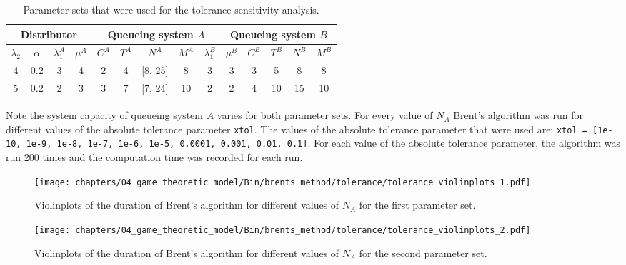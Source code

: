 \begin{table}[H]
    \caption{Parameter sets that were used for the tolerance
    sensitivity analysis.}
    \begin{center}
        \small
        \begin{tabular}{||c|c|c|c||c|c|c|c|c||c|c|c|c|c||}
            \hline
            \multicolumn{4}{||c||}{\textbf{Distributor}} &
            \multicolumn{5}{c||}{\textbf{Queueing system \(A\)}} &
            \multicolumn{5}{c||}{\textbf{Queueing system \(B\)}} \\
            \hline
            \(\lambda_2\) & \(\alpha\) &
            \(\lambda_1^A\) & \(\mu^A\) & \(C^A\) & \(T^A\) & \(N^A\) & \(M^A\) &
            \(\lambda_1^B\) & \(\mu^B\) & \(C^B\) & \(T^B\) & \(N^B\) & \(M^B\) \\
            \hline
            4 & 0.2 & 3 & 4 & 2 & 4 & [8, 25] & 8 & 3 & 3 & 3 & 5 & 8 & 8 \\
            \hline
            5 & 0.2 & 2 & 3 & 3 & 7 & [7, 24] & 10 & 2 & 2 & 4 & 10 & 15 & 10 \\
            \hline
        \end{tabular}
    \end{center}
    \label{tab:tolerance_sensitivity_parameters}
\end{table}

Note the system capacity of queueing system \(A\) varies for both parameter sets.
For every value of \(N_A\) Brent's algorithm was run for different values of
the absolute tolerance parameter \texttt{xtol}.
The values of the absolute tolerance parameter that were used are:
\texttt{xtol = [1e-10, 1e-9, 1e-8, 1e-7, 1e-6, 1e-5, 0.0001, 0.001, 0.01, 0.1]}.
For each value of the absolute tolerance parameter, the algorithm was run 200
times and the computation time was recorded for each run.

\begin{figure}[H]
    \centering
    \texttt{[image: chapters/04\_game\_theoretic\_model/Bin/brents\_method/tolerance/tolerance\_violinplots\_1.pdf]}
    \caption{
        Violinplots of the duration of Brent's algorithm for different values of
        \(N_A\) for the first parameter set.}
    \label{fig:tolerance_violinplots_1}
\end{figure}


\begin{figure}[H]
    \centering
    \texttt{[image: chapters/04\_game\_theoretic\_model/Bin/brents\_method/tolerance/tolerance\_violinplots\_2.pdf]}
    \caption{
        Violinplots of the duration of Brent's algorithm for different values of
        \(N_A\) for the second parameter set.}
    \label{fig:tolerance_violinplots_2}
\end{figure}


